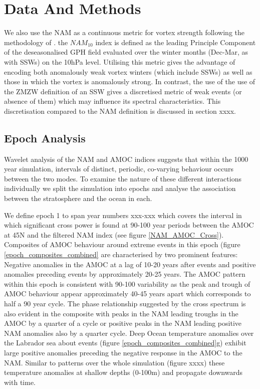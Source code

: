 \section{Data And Methods}

We also use the NAM as a continuous metric for vortex strength following the methodology of \cite{baldwinStratospheric2001}. the $NAM_{10}$ index is defined as the leading Principle Component of the deseasonalised GPH field evaluated over the winter months (Dec-Mar, as with SSWs) on the 10hPa level. Utilising this metric gives the advantage of encoding both anomalously weak vortex winters (which include SSWs) as well as those in which the vortex is anomalously strong. In contrast, the use of the use of the ZMZW definition of an SSW gives a discretised metric of weak events (or absence of them) which may influence its spectral characteristics. This discretisation compared to the NAM definition is discussed in section xxxx.







\subsection{Epoch Analysis}
Wavelet analysis of the NAM and AMOC indices suggests that within the 1000 year simulation, intervals of distinct, periodic, co-varying behaviour occurs between the two modes. To examine the nature of these different interactions individually we split the simulation into epochs and analyse the association between the stratosphere and the ocean in each. 

We define epoch 1 to span year numbers xxx-xxx which covers the interval in which significant cross power is found at 90-100 year periods between the AMOC at 45N and the filtered NAM index (see figure \ref{NAM_AMOC_Cross}). Composites of AMOC behaviour around extreme events in this epoch (figure \ref{epoch_composites_combined} are characterised by two prominent features: Negative anomalies in the AMOC at a lag of 10-20 years after events and positive anomalies preceding events by approximately 20-25 years. The AMOC pattern within this epoch is consistent with 90-100 variability as the peak and trough of AMOC behaviour appear approximately 40-45 years apart which corresponds to half a 90 year cycle. The phase relationship suggested by the cross spectrum is also evident in the composite with peaks in the NAM leading troughs in the AMOC by a quarter of a cycle or positive peaks in the NAM leading positive NAM anomalies also by a quarter cycle. Deep Ocean temperature anomalies over the Labrador sea about events (figure \ref{epoch_composites_combined}g) exhibit large positive anomalies preceding the negative response in the AMOC to the NAM. Similar to patterns over the whole simulation (figure xxxx) these temperature anomalies at shallow depths (0-100m) and propagate downwards with time.

